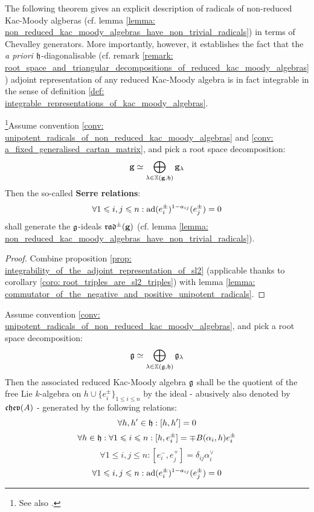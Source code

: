             The following theorem gives an explicit description of radicals of non-reduced Kac-Moody algberas (cf. lemma \ref{lemma: non_reduced_kac_moody_algebras_have_non_trivial_radicals}) in terms of Chevalley generators. More importantly, however, it establishes the fact that the \textit{a priori} $\mathfrak{h}$-diagonalisable (cf. remark \ref{remark: root_space_and_triangular_decompositions_of_reduced_kac_moody_algebras}) adjoint representation of any reduced Kac-Moody algebra is in fact integrable in the sense of definition \ref{def: integrable_representations_of_kac_moody_algebras}.
            \begin{theorem} \label{theorem: serre_relations_generate_radical_of_non_reduced_kac_moody_algebras}
                \cite[Proposition 4.2.7]{perrin_kac_moody_algebras} \footnote{See also \cite[Theorem 9.11]{kac_infinite_dimensional_lie_algebras}.}Assume convention \ref{conv: unipotent_radicals_of_non_reduced_kac_moody_algebras} and \ref{conv: a_fixed_generalised_cartan_matrix}, and pick a root space decomposition:
                    $$\mathbf{g} \simeq \bigoplus_{\lambda \in \mathbb{X}(\mathbf{g}, \mathfrak{h})} \mathbf{g}_{\lambda}$$
                Then the so-called \textbf{Serre relations}:
                    $$\forall 1 \leqslant i, j \leqslant n: \mathrm{ad}(e_i^{\pm})^{1 - a_{ij}}(e_j^{\pm}) = 0$$
                shall generate the $\mathfrak{g}$-ideals $\mathfrak{rad}^{\pm}(\mathbf{g})$ (cf. lemma \ref{lemma: non_reduced_kac_moody_algebras_have_non_trivial_radicals}).
            \end{theorem}
                \begin{proof}
                    Combine proposition \ref{prop: integrability_of_the_adjoint_representation_of_sl2} (applicable thanks to corollary \ref{coro: root_triples_are_sl2_triples}) with lemma \ref{lemma: commutator_of_the_negative_and_positive_unipotent_radicals}. 
                \end{proof}
            \begin{corollary} \label{coro: presentations_of_reduced_kac_moody_algebras}
                Assume convention \ref{conv: unipotent_radicals_of_non_reduced_kac_moody_algebras}, and pick a root space decomposition:
                    $$\mathfrak{g} \simeq \bigoplus_{\lambda \in \mathbb{X}(\mathfrak{g}, \mathfrak{h})} \mathfrak{g}_{\lambda}$$
                Then the associated reduced Kac-Moody algebra $\mathfrak{g}$ shall be the quotient of the free Lie $k$-algebra on $h \cup \{e_i^{\pm}\}_{1 \leq i \leq n}$ by the ideal - abusively also denoted by $\mathfrak{chev}(A)$ - generated by the following relations:
                    $$\forall h, h' \in \mathfrak{h}: [h, h'] = 0$$
                    $$\forall h \in \mathfrak{h}: \forall 1 \leqslant i \leqslant n: [h, e_i^{\pm}] = \mp B(\alpha_i, h) e_i^{\pm}$$
                    $$\forall 1 \leq i, j \leq n: [e_i^-, e_j^+] = \delta_{ij} \alpha_i^{\vee}$$
                    $$\forall 1 \leqslant i, j \leqslant n: \mathrm{ad}(e_i^{\pm})^{1 - a_{ij}}(e_j^{\pm}) = 0$$
            \end{corollary}
